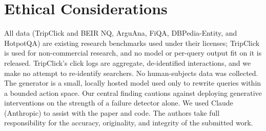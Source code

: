 \documentclass[sigconf,anonymous,review]{acmart}
\begin{document}
\section*{Ethical Considerations}

All data (TripClick and BEIR NQ, ArguAna, FiQA, DBPedia-Entity, and HotpotQA) are existing
research benchmarks used under their licenses; TripClick is used for
non-commercial research, and no model or per-query output fit on it is
released. TripClick's click logs are aggregate, de-identified
interactions, and we make no attempt to re-identify searchers. No
human-subjects data was collected. The generator is a small, locally
hosted model used only to rewrite queries within a bounded action
space. Our central finding cautions against deploying generative
interventions on the strength of a failure detector alone.
We used Claude (Anthropic) to assist with the paper and code. The
authors take full responsibility for the accuracy, originality, and
integrity of the submitted work.



\end{document}
